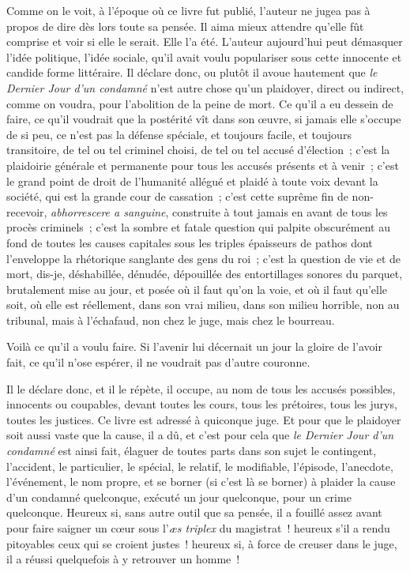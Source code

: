\documentclass[french,twoside]{book} %
\begin{document}
\noindent Comme on le voit, à l’époque où ce livre fut publié, l’auteur ne jugea pas à propos de dire dès lors toute sa  pensée. Il aima mieux attendre qu’elle fût comprise et voir si elle le serait. Elle l’a été. L’auteur aujourd’hui peut démasquer l’idée politique, l’idée sociale, qu’il avait voulu populariser sous cette innocente et candide forme littéraire. Il déclare donc, ou plutôt il avoue hautement que \emph{le Dernier Jour d’un condamné} n’est autre chose qu’un plaidoyer, direct ou indirect, comme on voudra, pour l’abolition de la peine de mort. Ce qu’il a eu dessein de faire, ce qu’il voudrait que la postérité vît dans son œuvre, si jamais elle s’occupe de si peu, ce n’est pas la défense spéciale, et toujours facile, et toujours transitoire, de tel ou tel criminel choisi, de tel ou tel accusé d’élection ; c’est la plaidoirie générale et permanente pour tous les accusés présents et à venir ; c’est le grand point de droit de l’humanité allégué et plaidé à toute voix devant la société, qui est la grande cour de cassation ; c’est cette suprême fin de non-recevoir, \emph{abhorrescere a sanguine}, construite à tout jamais en avant de tous les procès criminels ; c’est la sombre et fatale question qui palpite obscurément au fond de toutes les causes capitales sous les triples épaisseurs de pathos dont l’enveloppe la rhétorique sanglante des gens du roi ; c’est la question de vie et de mort, dis-je, déshabillée, dénudée, dépouillée des entortillages sonores du parquet, brutalement mise au jour, et posée où il faut qu’on la voie, et où il faut qu’elle soit, où elle est réellement, dans son vrai milieu, dans son milieu horrible, non au tribunal, mais à l’échafaud, non chez le juge, mais chez le bourreau.\par
Voilà ce qu’il a voulu faire. Si l’avenir lui décernait un jour la gloire de l’avoir fait, ce qu’il n’ose espérer, il ne voudrait pas d’autre couronne.\par
 Il le déclare donc, et il le répète, il occupe, au nom de tous les accusés possibles, innocents ou coupables, devant toutes les cours, tous les prétoires, tous les jurys, toutes les justices. Ce livre est adressé à quiconque juge. Et pour que le plaidoyer soit aussi vaste que la cause, il a dû, et c’est pour cela que \emph{le Dernier Jour d’un condamné} est ainsi fait, élaguer de toutes parts dans son sujet le contingent, l’accident, le particulier, le spécial, le relatif, le modifiable, l’épisode, l’anecdote, l’événement, le nom propre, et se borner (si c’est là se borner) à plaider la cause d’un condamné quelconque, exécuté un jour quelconque, pour un crime quelconque. Heureux si, sans autre outil que sa pensée, il a fouillé assez avant pour faire saigner un cœur sous l’\emph{æs triplex} du magistrat ! heureux s’il a rendu pitoyables ceux qui se croient justes ! heureux si, à force de creuser dans le juge, il a réussi quelquefois à y retrouver un homme !\par
\end{document}
